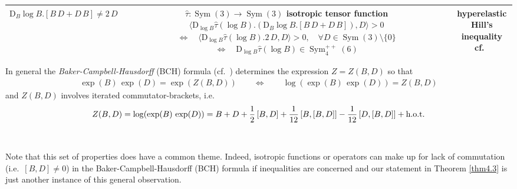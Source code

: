 \documentclass[10pt]{article}
\numberwithin{theoremCounter}{section}
\theoremstyle{plain}
\theoremstyle{definition}
\newcommand{\DD}{\mathrm{D}}
\DeclareMathOperator{\Sym}{Sym}
\numberwithin{equation}{section}
\begin{document}
\begin{tabular}{|c | c | c|}
\hline
$\DD_B \log B.[B \, D + D \, B] \neq 2 \, D$ & \makecell{$\widehat \tau\colon\Sym(3) \to \Sym(3)$ isotropic tensor function \\ $\langle \DD_{\log B} \widehat \tau(\log B).(\DD_B \log B.[B \, D + D \, B]), D \rangle > 0$ \\ $\iff \quad \langle \DD_{\log B} \widehat \tau(\log B). 2 \, D, D \rangle > 0, \quad \forall D \in \Sym(3) \! \setminus \! \{0\}$ \\ $\iff \quad \DD_{\log B} \widehat \tau(\log B) \in \Sym^{++}_4(6)$}  & \makecell{hyperelastic \\ Hill's inequality \\ cf.~\cite{tobedone}} \\ 
\hline
\end{tabular}
\footnotetext
{
In general the \emph{Baker-Campbell-Hausdorff} (BCH) formula (cf.~\cite[p.861]{hofmann1998}) determines the expression $Z = Z(B, D)$ so that
	\begin{align*}
	\exp(B) \, \exp(D) = \exp(Z(B,D)) \qquad \iff \qquad \log(\exp(B) \, \exp(D)) = Z(B, D)
	\end{align*}
and $Z(B, D)$ involves iterated commutator-brackets, i.e.
	\begin{align*}
	Z(B,D) = \log(\exp(B) \, \exp(D)) = B + D + \frac12 \, [B, D] + \frac{1}{12} \, [B,[B,D]] - \frac{1}{12} \, [D,[B,D]] + \textnormal{h.o.t.}
	\end{align*}
}
\endgroup \\
\\[2em]
Note that this set of properties does have a common theme. Indeed, isotropic functions or operators can make up for lack of commutation (i.e.\ $[B , D] \neq 0$) in the Baker-Campbell-Hausdorff (BCH) \cite[p.861]{hofmann1998} formula if inequalities are concerned and our statement in Theorem \ref{thm4.3} is just another instance of this general observation.
%
\end{document}
